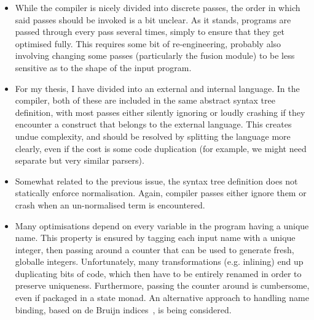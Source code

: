 \begin{itemize}
\item While the compiler is nicely divided into discrete passes, the
  order in which said passes should be invoked is a bit unclear.  As
  it stands, programs are passed through every pass several times,
  simply to ensure that they get optimised fully.  This requires some
  bit of re-engineering, probably also involving changing some passes
  (particularly the fusion module) to be less sensitive as to the
  shape of the input program.

\item For my thesis, I have divided \LO{} into an external and
  internal language.  In the compiler, both of these are included in
  the same abstract syntax tree definition, with most passes either
  silently ignoring or loudly crashing if they encounter a construct
  that belongs to the external language.  This creates undue
  complexity, and should be resolved by splitting the language more
  clearly, even if the cost is some code duplication (for example, we
  might need separate but very similar parsers).

\item Somewhat related to the previous issue, the \LO{} syntax tree
  definition does not statically enforce normalisation.  Again,
  compiler passes either ignore them or crash when an un-normalised
  term is encountered.

\item Many optimisations depend on every variable in the program
  having a unique name.  This property is ensured by tagging each
  input name with a unique integer, then passing around a counter that
  can be used to generate fresh, globalle integers.  Unfortunately,
  many transformations (e.g. inlining) end up duplicating bits of
  code, which then have to be entirely renamed in order to preserve
  uniqueness.  Furthermore, passing the counter around is cumbersome,
  even if packaged in a state monad.  An alternative approach to
  handling name binding, based on de Bruijn
  indices~\cite{McBride:2004:FPI:1017472.1017477}, is being
  considered.
\end{itemize}


